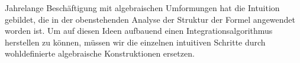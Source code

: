 Jahrelange Beschäftigung mit algebraischen Umformungen hat die Intuition
gebildet, die in der obenstehenden Analyse der Struktur der Formel
angewendet worden ist.
Um auf diesen Ideen aufbauend einen Integrationsalgorithmus herstellen
zu können, müssen wir die einzelnen intuitiven Schritte durch wohldefinierte
algebraische Konstruktionen ersetzen.







